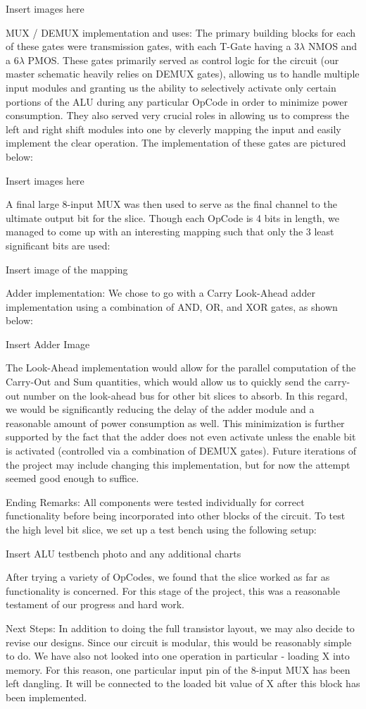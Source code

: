 \documentclass[12pt]{article}
\begin{document}
	Insert images here 
	
	MUX / DEMUX implementation and uses:
	The primary building blocks for each of these gates were transmission gates, with each 
	T-Gate having a 3$\lambda$ NMOS and a 6$\lambda$ PMOS. These gates primarily served
	as control logic for the circuit (our master schematic heavily relies on DEMUX gates), 
	allowing us to handle multiple input modules and granting us the ability to selectively 
	activate only certain portions of the ALU during any particular OpCode
	in order to minimize power consumption. They also served very crucial roles in allowing us to
	compress the left and right shift modules into one by cleverly mapping the input and easily 
	implement the clear operation. The implementation of these gates are pictured below:
	
	Insert images here
	
	A final large 8-input MUX was then used to serve as the final channel to the ultimate output 
	bit for the slice. Though each OpCode is 4 bits in length, we managed to come up with an 
	interesting mapping such that only the 3 least significant bits are used:
	
	Insert image of the mapping
	
	Adder implementation:
	We chose to go with a Carry Look-Ahead adder implementation using a combination of AND,
	OR, and XOR gates, as shown below:
	
	Insert Adder Image
	
	The Look-Ahead implementation would allow for the parallel computation of the Carry-Out and
	Sum quantities, which would allow us to quickly send the carry-out number on the look-ahead
	bus for other bit slices to absorb. In this regard, we would be significantly reducing the delay
	of the adder module and a reasonable amount of power consumption as well. This minimization
	is further supported by the fact that the adder does not even activate unless the enable bit
	is activated (controlled via a combination of DEMUX gates). Future iterations of the project 
	may include changing this implementation, but for now the attempt seemed good enough to
	suffice.
	
	Ending Remarks:
	All components were tested individually for correct functionality before being incorporated 
	into other blocks of the circuit. To test the high level bit slice, we set up a test bench using
	the following setup:
	
	Insert ALU testbench photo and any additional charts
	
	After trying a variety of OpCodes, we found that the slice worked as far as functionality 
	is concerned. For this stage of the project, this was a reasonable testament of our progress
	and hard work.
	
	Next Steps:
	In addition to doing the full transistor layout, we may also decide to revise our designs. Since
	our circuit is modular, this would be reasonably simple to do. We have also not looked into
	one operation in particular - loading X into memory. For this reason, one particular input pin 
	of the 8-input MUX has been left dangling. It will be connected to the loaded bit value of
	X after this block has been implemented. 
\end{document}
